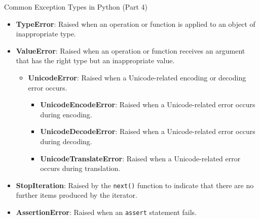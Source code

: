 \begin{frame}{Common Exception Types in Python (Part 4)}
    \begin{itemize}
        \item \textbf{TypeError}: Raised when an operation or function is applied to an object of inappropriate type.
        \item \textbf{ValueError}: Raised when an operation or function receives an argument that has the right type but an inappropriate value.
            \begin{itemize}
                \item \textbf{UnicodeError}: Raised when a Unicode-related encoding or decoding error occurs.
                    \begin{itemize}
                        \item \textbf{UnicodeEncodeError}: Raised when a Unicode-related error occurs during encoding.
                        \item \textbf{UnicodeDecodeError}: Raised when a Unicode-related error occurs during decoding.
                        \item \textbf{UnicodeTranslateError}: Raised when a Unicode-related error occurs during translation.
                    \end{itemize}
            \end{itemize}
        \item \textbf{StopIteration}: Raised by the \texttt{next()} function to indicate that there are no further items produced by the iterator.
        \item \textbf{AssertionError}: Raised when an \texttt{assert} statement fails.
    \end{itemize}
\end{frame}